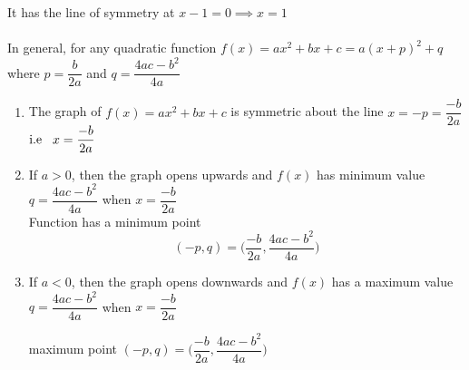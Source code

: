 \documentclass[11pt,a4paper]{article}
\begin{document}
It has the line of symmetry at $x-1=0\implies x=1$\\\\

In general, for any quadratic function $f(x)=ax^2+bx+c=a(x+p)^2+q$ where $p=\dfrac{b}{2a}$ and $q=\dfrac{4ac-b^2}{4a}$
\begin{enumerate}
\item The graph of $f(x)=ax^2+bx+c$ is symmetric about the line $x=-p=\dfrac{-b}{2a}$\hspace{0.2cm}
$\text{i.e}\hspace{0.3cm} x=\dfrac{-b}{2a}$
\item If $a>0$, then the graph opens upwards and $f(x)$ has minimum value $q=\dfrac{4ac-b^2}{4a}$ when $x=\dfrac{-b}{2a}$\\

Function has a minimum point $$(-p,q)=\bigg(\dfrac{-b}{2a},\dfrac{4ac-b^2}{4a}\bigg)$$

\begin{figure}[H]
\centering
{}
\end{figure}


\item If $a<0$, then the graph opens downwards and $f(x)$ has a maximum value\\ $q=\dfrac{4ac-b^2}{4a}$ when $x=\dfrac{-b}{2a}$


\begin{figure}[H]
\centering
{}
\end{figure}

maximum point \hspace{0.2cm}$(-p,q)=\bigg(\dfrac{-b}{2a},\dfrac{4ac-b^2}{4a}\bigg)$\\\\
\end{enumerate}
\end{document}
